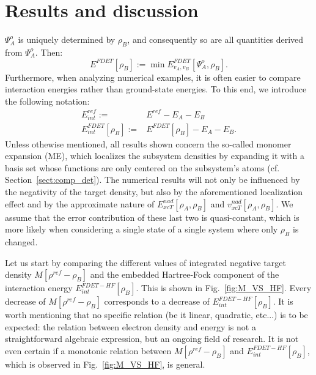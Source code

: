 \documentclass[journal=jctcce,manuscript=article, layout=twocolumn]{achemso}
\begin{document}
\section{Results and discussion}
$\Psi^{o}_A$ is uniquely determined by $\rho_B$, and consequently so are all quantities derived from $\Psi^{o}_A$. Then:
\begin{equation}
 E^{FDET}[\rho_B] := \min E_{v_A,v_B}^{FDET}[\Psi^{o}_{A},\rho_B].
\end{equation}
Furthermore, when analyzing numerical examples, it is often easier to compare interaction energies rather than ground-state energies. To this end, we introduce the following notation:
\begin{align}
 E^{ref}_{int} := & E^{ref} - E_A - E_B \\ \nonumber
 E^{FDET}_{int}[\rho_B] := & E^{FDET}[\rho_B] - E_A - E_B.
\end{align}
Unless othewise mentioned, all results shown concern the so-called monomer expansion (ME), which localizes the subsystem densities by expanding it with a basis set whose functions are only centered on the subsystem's atoms (cf. Section~\ref{sect:comp_det}).
The numerical results will not only be influenced by the negativity of the target density, but also by the aforementioned localization effect and by the approximate nature of $E_{xcT}^{nad}[\rho_A, \rho_B]$ and $v_{xcT}^{nad}[\rho_A, \rho_B]$. We assume that the error contribution of these last two is quasi-constant, which is more likely when considering a single state of a single system where only $\rho_B$ is changed.

Let us start by comparing the different values of integrated negative target density $M[\rho^{ref} - \rho_B]$ and the embedded Hartree-Fock component of the interaction energy $E^{FDET-HF}_{int}[\rho_B]$. This is shown in Fig.~\ref{fig:M_VS_HF}.
Every decrease of $M[\rho^{ref} - \rho_B]$ corresponds to a decrease of $E^{FDET-HF}_{int}[\rho_B]$. It is worth mentioning that no specific relation (be it linear, quadratic, etc...) is to be expected: the relation between electron density and energy is not a straightforward algebraic expression, but an ongoing field of research. It is not even certain if a monotonic relation between $M[\rho^{ref} - \rho_B]$ and $E^{FDET-HF}_{int}[\rho_B]$, which is observed in Fig.~\ref{fig:M_VS_HF}, is general.
\end{document}
